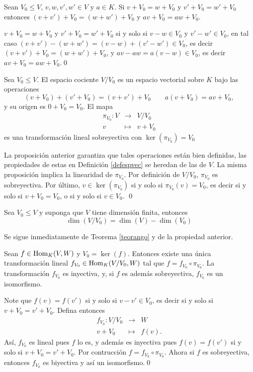 \begin{prop}
Sean $V_0\le V$, $v,w,v',w'\in V$ y $a\in K$. Si $v+V_0=w+V_0$ y $v'+V_0=w'+V_0$ entonces $(v+v')+V_0=(w+w')+V_0$ y $av+V_0=aw+V_0$.
\end{prop}

\dem $v+V_0=w+V_0$ y $v'+V_0=w'+V_0$ si y solo si $v-w\in V_0$ y $v'-w'\in V_0$, en tal caso $(v+v')-(w+w')=(v-w)+(v'-w')\in V_0$, es decir $(v+v')+V_0=(w+w')+V_0$, y $av-aw=a(v-w)\in V_0$, es decir $av+V_0=aw+V_0$.\qed

\begin{prop}
Sea $V_0\le V$. El espacio cociente $V/V_0$ es un espacio vectorial sobre $K$ bajo las operaciones
\[
\left(v+V_0\right)+\left(v'+V_0\right)=(v+v')+V_0\qquad a\left(v+V_0\right)=av+V_0,
\]
y su origen es $0+V_0=V_0$. El mapa
\begin{eqnarray*}
\pi_{V_0}: V & \longrightarrow & V/V_0 \\
                v & \longmapsto & v+V_0
\end{eqnarray*}
es una transformaci\'on lineal sobreyectiva con $\ker(\pi_{V_0})=V_0$
\end{prop}

\dem La proposici\'on anterior garantiza que tales operaciones est\'an bien definidas, las propiedades de estas en Definici\'on \ref{defespvec} se heredan de las de $V$. La misma proposici\'on implica la linearidad de $\pi_{V_0}$. Por definici\'on de $V/V_0$, $\pi_{V_0}$ es sobreyectiva. Por \'ultimo, $v\in\ker(\pi_{V_0})$ si y solo si $\pi_{V_0}(v)=V_0$, es decir si y solo si $v+V_0=V_0$, o si y solo si $v\in V_0$. \qed

\begin{prop}
Sea $V_0\le V$ y suponga que $V$ tiene dimensi\'on finita, entonces
\[
\dim(V/V_0)=\dim(V)-\dim(V_0)
\]
\end{prop}

\dem Se sigue inmediatamente de Teorema \ref{teorango} y de la propiedad anterior.

\begin{teo}
Sean $f\in\operatorname{Hom}_K(V,W)$ y $V_0=\ker(f)$. Entonces existe una \'unica transformaci\'on lineal $f_{V_0}\in\operatorname{Hom}_K(V/V_0,W)$ tal que $f=f_{V_0}\circ\pi_{V_0}$. La transformaci\'on $f_{V_0}$ es inyectiva, y, si $f$ es adem\'as sobreyectiva, $f_{V_0}$ es un isomorfismo.
\end{teo}

\dem Note que $f(v)=f(v')$ si y solo si $v-v'\in V_0$, es decir si y solo si $v+V_0=v'+V_0$. Defina entonces
\begin{eqnarray*}
f_{V_0}: V/V_0 & \longrightarrow & W\\
            v+V_0 & \longmapsto      & f(v).
\end{eqnarray*}
As\'i, $f_{V_0}$ es lineal pues $f$ lo es, y adem\'as es inyectiva pues $f(v)=f(v')$ si y solo si $v+V_0=v'+V_0$. Por contrucci\'on $f=f_{V_0}\circ\pi_{V_0}$. Ahora si $f$ es sobreyectiva, entonces $f_{V_0}$ es biyectiva y as\'i un isomorfismo.\qed
 